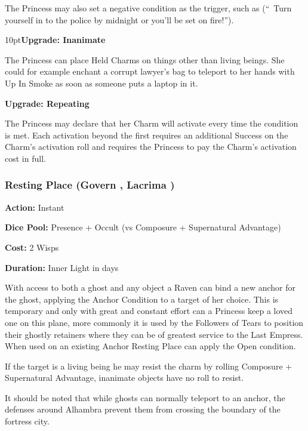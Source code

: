 The Princess may also set a negative condition as the trigger, such as (\textquotedblleft\, Turn yourself in to the police by midnight or you'll be set on fire!\textquotedblright). 

\begin{myindentpar}{10pt}\textbf{Upgrade: Inanimate}

The Princess can place Held Charms on things other than living beings. She could for example enchant a corrupt lawyer's bag to teleport to her hands with Up In Smoke as soon as someone puts a laptop in it.

\textbf{Upgrade: Repeating}

The Princess may declare that her Charm will activate every time the condition is met. Each activation beyond the first requires an additional Success on the Charm's activation roll and requires the Princess to pay the Charm's activation cost in full.\end{myindentpar}

\subsubsection*{Resting Place (Govern \textbullet\textbullet\textbullet, Lacrima \textbullet\textbullet\textbullet)}

\noindent \textbf{Action:} Instant

\noindent \textbf{Dice Pool:} Presence + Occult (vs Composure + Supernatural Advantage)

\noindent \textbf{Cost:} 2 Wisps

\noindent \textbf{Duration:} Inner Light in days

With access to both a ghost and any object a Raven can bind a new anchor for the ghost, applying the Anchor Condition to a target of her choice. This is temporary and only with great and constant effort can a Princess keep a loved one on this plane, more commonly it is used by the Followers of Tears to position their ghostly retainers where they can be of greatest service to the Last Empress. When used on an existing Anchor Resting Place can apply the Open condition. 

If the target is a living being he may resist the charm by rolling Composure + Supernatural Advantage, inanimate objects have no roll to resist. 

It should be noted that while ghosts can normally teleport to an anchor, the defenses around Alhambra prevent them from crossing the boundary of the fortress city.


